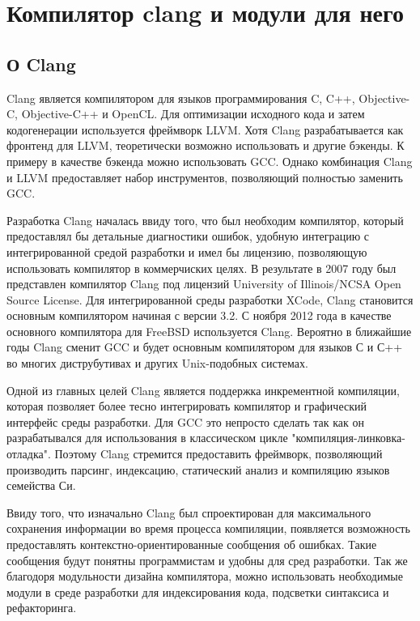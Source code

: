 \chapter{Компилятор clang и модули для него}

\section{О Clang}
Clang является компилятором для языков программирования C, C++, Objective-C, Objective-C++ и OpenCL.
Для оптимизации исходного кода и затем кодогенерации используется фреймворк LLVM. Хотя Clang разрабатывается
как фронтенд для LLVM, теоретически возможно использовать и другие бэкенды. К примеру в качестве бэкенда
можно использовать GCC. Однако комбинация Clang и LLVM предоставляет набор инструментов, 
позволяющий полностью заменить GCC. 

Разработка Clang началась ввиду того, что был необходим компилятор, который предоставлял бы 
детальные диагностики ошибок, удобную интеграцию с интегрированной средой разработки и имел бы
лицензию, позволяющую использовать компилятор в коммерчиских целях. В результате в 2007 году был 
представлен компилятор Clang под лицензий University of Illinois/NCSA Open Source License.
Для интегрированной среды разработки XCode, Clang становится основным компилятором начиная с версии 3.2.
С ноября 2012 года в качестве основного компилятора для FreeBSD используется Clang. Вероятно в ближайшие годы
Clang сменит GCC и будет основным компилятором для языков С и С++ во многих диструбутивах и
других Unix-подобных системах.

Одной из главных целей Clang является поддержка инкрементной компиляции, которая позволяет более
тесно интегрировать компилятор и графический интерфейс среды разработки. Для GCC это непросто 
сделать так как он разрабатывался для использования в классическом цикле "компиляция-линковка-отладка".
Поэтому Clang стремится предоставить фреймворк, позволяющий производить парсинг, индексацию, 
статический анализ и компиляцию языков семейства Си. 

Ввиду того, что изначально Clang был спроектирован для максимального сохранения информации во время 
процесса компиляции, появляется возможность предоставлять контекстно-ориентированные сообщения об ошибках.
Такие сообщения будут понятны программистам и удобны для сред разработки. Так же благодоря 
модульности дизайна компилятора, можно использовать необходимые модули в среде разработки для
индексирования кода, подсветки синтаксиса и рефакторинга.

